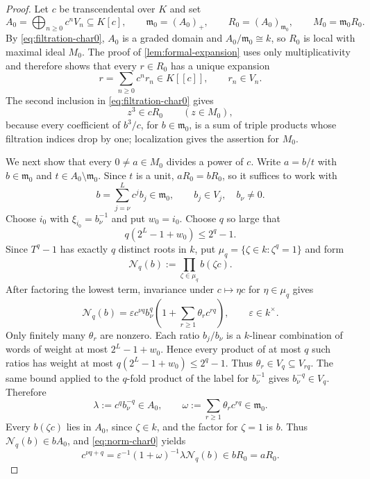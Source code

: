 \documentclass[10pt,a4paper]{amsart}
\newcommand{\fm}{\mathfrak m}
\begin{document}
\begin{proof}
Let $c$ be transcendental over $K$ and set
\[
 A_0=\bigoplus_{n\geq0}c^nV_n\subseteq K[c],\qquad
 \fm_0=(A_0)_+,
 \qquad R_0=(A_0)_{\fm_0},\qquad M_0=\fm_0R_0.
\]
By \eqref{eq:filtration-char0}, $A_0$ is a graded domain and
$A_0/\fm_0\cong k$, so $R_0$ is local with maximal ideal $M_0$.  The proof
of \cref{lem:formal-expansion} uses only multiplicativity and therefore
shows that every $r\in R_0$ has a unique expansion
\begin{equation}\label{eq:formal-char0}
  r=\sum_{n\geq0}c^nr_n\in K[[c]],\qquad r_n\in V_n.
\end{equation}
The second inclusion in \eqref{eq:filtration-char0} gives
\begin{equation}\label{eq:cube-char0}
  z^3\in cR_0\qquad(z\in M_0),
\end{equation}
because every coefficient of $b^3/c$, for $b\in\fm_0$, is a sum of
triple products whose filtration indices drop by one; localization gives
the assertion for $M_0$.

We next show that every $0\neq a\in M_0$ divides a power of $c$.  Write
$a=b/t$ with $b\in\fm_0$ and $t\in A_0\setminus\fm_0$.  Since $t$ is a
unit, $aR_0=bR_0$, so it suffices to work with
\[
  b=\sum_{j=\nu}^{L}c^jb_j\in\fm_0,
  \qquad b_j\in V_j,\quad b_\nu\neq0.
\]
Choose $i_0$ with $\xi_{i_0}=b_\nu^{-1}$ and put $w_0=i_0$.
Choose $q$ so large that
\[
  q(2^L-1+w_0)\leq2^q-1.
\]
Since $T^q-1$ has exactly $q$ distinct roots in $k$, put
$\mu_q=\{\zeta\in k:\zeta^q=1\}$ and form
\[
  \mathcal N_q(b):=\prod_{\zeta\in\mu_q}b(\zeta c).
\]
After factoring the lowest term, invariance under $c\mapsto\eta c$ for
$\eta\in\mu_q$ gives
\begin{equation}\label{eq:norm-char0}
 \mathcal N_q(b)=\varepsilon c^{\nu q}b_\nu^q
  \left(1+\sum_{r\geq1}\theta_r c^{rq}\right),
  \qquad \varepsilon\in k^\times.
\end{equation}
Only finitely many $\theta_r$ are nonzero.
Each ratio $b_j/b_\nu$ is a $k$-linear combination of words of weight at
most $2^L-1+w_0$.  Hence every product of at most $q$ such ratios has weight
at most $q(2^L-1+w_0)\leq2^q-1$.  Thus
$\theta_r\in V_q\subseteq V_{rq}$.  The same bound applied to the $q$-fold
product of the label for $b_\nu^{-1}$ gives $b_\nu^{-q}\in V_q$.
Therefore
\[
 \lambda:=c^qb_\nu^{-q}\in A_0,
 \qquad \omega:=\sum_{r\geq1}\theta_rc^{rq}\in\fm_0.
\]
Every $b(\zeta c)$ lies in $A_0$, since $\zeta\in k$, and the factor for
$\zeta=1$ is $b$.  Thus $\mathcal N_q(b)\in bA_0$, and
\eqref{eq:norm-char0} yields
\[
 c^{\nu q+q}=\varepsilon^{-1}(1+\omega)^{-1}
   \lambda\mathcal N_q(b)\in bR_0=aR_0.
\]


\end{proof}
\end{document}
